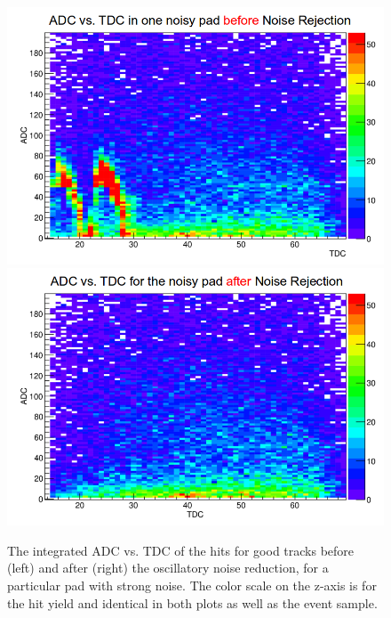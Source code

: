 \begin{figure}[tbp]
\centering
\includegraphics[scale=0.3]{fig_rtpc/noisy_pad_before_rejection.png}
\includegraphics[scale=0.3]{fig_rtpc/noisy_pad_after_rejection.png}
\caption{The integrated ADC vs. TDC of the hits for good tracks before (left) 
and after (right) the oscillatory noise reduction, for a particular pad with 
strong noise. The color scale on the z-axis is for the hit yield and identical 
in both plots as well as the event sample.}
\label{fig:Adcvstdcnoise}
\end{figure}

